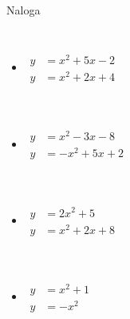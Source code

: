 \begin{frame}
{\begin{exampleblock}{Naloga}
\begin{columns}
                \begin{itemize}
                    \item $ \begin{aligned}
                        y&=x^2+5x-2 \\ y&=x^2+2x+4
                    \end{aligned} $ \\~\\~

                    \item $ \begin{aligned}
                        y&=x^2-3x-8 \\ y&=-x^2+5x+2
                    \end{aligned} $ \\~\\~

                    \item $ \begin{aligned}
                        y&=2x^2+5 \\ y&=x^2+2x+8
                    \end{aligned} $ \\~\\~

                    \item $ \begin{aligned}
                        y&=x^2+1 \\ y&=-x^2
                    \end{aligned} $
                \end{itemize}

            \end{columns}

        \end{exampleblock}}
    \end{frame}


